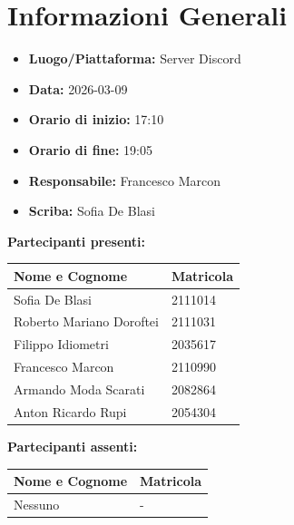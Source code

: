 \section{Informazioni Generali}
\begin{itemize}
    \item \textbf{Luogo/Piattaforma:} Server Discord
    \item \textbf{Data:} 2026-03-09
    \item \textbf{Orario di inizio:} 17:10
    \item \textbf{Orario di fine:} 19:05
    \item \textbf{Responsabile:} Francesco Marcon
    \item \textbf{Scriba:} Sofia De Blasi
\end{itemize}

\vspace{0.5cm}
\textbf{Partecipanti presenti:}
\begin{table}[ht]
    \centering
    \renewcommand{\arraystretch}{1.2}
    \begin{tabularx}{\textwidth}{X l}
        \toprule
        \textbf{Nome e Cognome} & \textbf{Matricola} \\
        \midrule
        Sofia De Blasi & 2111014 \\
        Roberto Mariano Doroftei & 2111031 \\
        Filippo Idiometri & 2035617 \\
        Francesco Marcon & 2110990 \\
        Armando Moda Scarati & 2082864 \\
        Anton Ricardo Rupi & 2054304 \\
        \bottomrule
    \end{tabularx}
\end{table}

\vspace{0.5cm}
\textbf{Partecipanti assenti:}
\begin{table}[ht]
    \centering
    \renewcommand{\arraystretch}{1.2}
    \begin{tabularx}{\textwidth}{X l}
        \toprule
        \textbf{Nome e Cognome} & \textbf{Matricola} \\
        \midrule
        Nessuno & - \\
        \bottomrule
    \end{tabularx}
\end{table}

